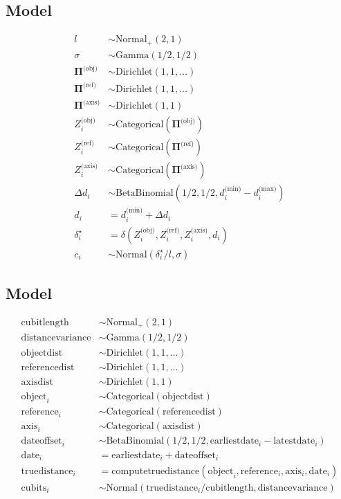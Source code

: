 \documentclass{article}
\begin{document}
\subsection{Model}
\begin{align*}
    l &\sim \textrm{Normal}_{+}(2,1) \\
    \sigma &\sim \textrm{Gamma}(1/2,1/2) \\
    \mathbf{\Pi}^\textrm{(obj)} &\sim \textrm{Dirichlet}(1,1,\dots) \\
    \mathbf{\Pi}^\textrm{(ref)} &\sim \textrm{Dirichlet}(1,1,\dots) \\
    \mathbf{\Pi}^\textrm{(axis)} &\sim \textrm{Dirichlet}(1,1) \\
    Z^\textrm{(obj)}_i &\sim \textrm{Categorical}(\mathbf{\Pi}^\textrm{(obj)}) \\
    Z^\textrm{(ref)}_i &\sim \textrm{Categorical}(\mathbf{\Pi}^\textrm{(ref)}) \\
    Z^\textrm{(axis)}_i &\sim \textrm{Categorical}(\mathbf{\Pi}^\textrm{(axis)}) \\
    \Delta d_i &\sim \textrm{BetaBinomial}(1/2,1/2,d^\textrm{(min)}_i-d^\textrm{(max)}_i) \\
    d_i &= d^\textrm{(min)}_i + \Delta d_i \\
    \delta^\star_i &= \delta(Z^\textrm{(obj)}_i,Z^\textrm{(ref)}_i,Z^\textrm{(axis)}_i,d_i) \\
    c_i &\sim \textrm{Normal}(\delta^\star_i / l, \sigma)
\end{align*}

\subsection{Model}
\begin{align*}
    \textrm{cubitlength} &\sim \textrm{Normal}_{+}(2,1) \\
    \textrm{distancevariance} &\sim \textrm{Gamma}(1/2,1/2) \\
    \textrm{objectdist} &\sim \textrm{Dirichlet}(1,1,\dots) \\
    \textrm{referencedist} &\sim \textrm{Dirichlet}(1,1,\dots) \\
    \textrm{axisdist} &\sim \textrm{Dirichlet}(1,1) \\
    \textrm{object}_i &\sim \textrm{Categorical}(\textrm{objectdist}) \\
    \textrm{reference}_i &\sim \textrm{Categorical}(\textrm{referencedist}) \\
    \textrm{axis}_i &\sim \textrm{Categorical}(\textrm{axisdist}) \\
    \textrm{dateoffset}_i &\sim \textrm{BetaBinomial}(1/2,1/2,\textrm{earliestdate}_i-\textrm{latestdate}_i) \\
    \textrm{date}_i &= \textrm{earliestdate}_i + \textrm{dateoffset}_i \\
    \textrm{truedistance}_i &= \textrm{computetruedistance}(\textrm{object}_i,\textrm{reference}_i,\textrm{axis}_i,\textrm{date}_i) \\
    \textrm{cubits}_i &\sim \textrm{Normal}(\textrm{truedistance}_i / \textrm{cubitlength}, \textrm{distancevariance})
\end{align*}
\end{document}
